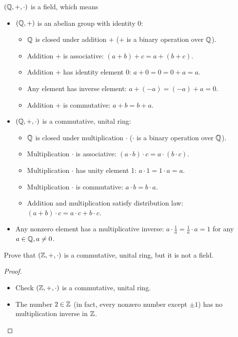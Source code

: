 \begin{proposition}
$(\mathbb Q,+,\cdot)$ is a field, which means
\begin{itemize}
\item $(\mathbb Q,+)$ is an abelian group with identity $0$:
\begin{itemize}
    \item $\mathbb Q$ is closed under addition $+$ ($+$ is a binary operation over $\mathbb Q$).
    \item Addition $+$ is associative: $(a+b)+c=a+(b+c)$.
    \item Addition $+$ has identity element $0$: $a+0=0=0+a=a$.
    \item Any element has inverse element: $a+(-a)=(-a)+a=0$.
    \item Addition $+$ is commutative: $a+b=b+a$.
\end{itemize}

\item $(\mathbb Q,+,\cdot)$ is a commutative, unital ring:
\begin{itemize}
    \item $\mathbb Q$ is closed under multiplication $\cdot$ ($\cdot$ is a binary operation over $\mathbb Q$).
    \item Multiplication $\cdot$ is associative: $(a\cdot b)\cdot c=a\cdot(b\cdot c)$.
    \item Multiplication $\cdot$ has unity element 1: $a\cdot1=1\cdot a=a$.
    \item Multiplication $\cdot$ is commutative: $a\cdot b=b\cdot a$.
    \item Addition and multiplication satisfy distribution law: $(a+b)\cdot c=a\cdot c+b\cdot c$.
\end{itemize}

\item Any nonzero element has a multiplicative inverse: $a\cdot\frac{1}{a}=\frac{1}{a}\cdot a=1$ for any $a\in\mathbb Q,a\neq0$.
\end{itemize}
\end{proposition}

\begin{exercise}{}{}
Prove that $(\mathbb Z,+,\cdot)$ is a commutative, unital ring, but it is not a field.
\end{exercise}

\begin{proof} \
\begin{itemize}
\item Check $(\mathbb Z,+,\cdot)$ is a commutative, unital ring.
\item The number $2\in\mathbb Z$ (in fact, every nonzero number except $\pm1$) has no multiplication inverse in $\mathbb Z$.
\end{itemize}
\end{proof}

